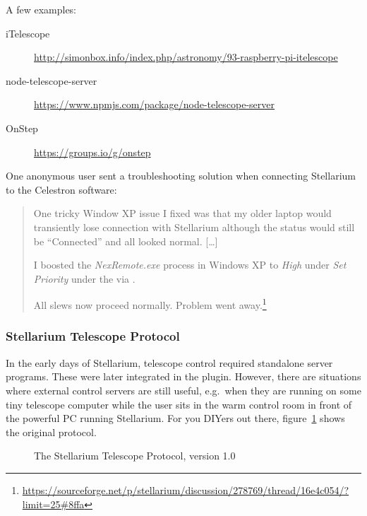 A few examples:
\begin{description}
\item[iTelescope] \url{http://simonbox.info/index.php/astronomy/93-raspberry-pi-itelescope}
\item[node-telescope-server] \url{https://www.npmjs.com/package/node-telescope-server}
\item[OnStep] \url{https://groups.io/g/onstep}
\end{description}

One anonymous user sent a troubleshooting solution when connecting Stellarium to the Celestron  software:
\begin{quote}

  One tricky Window XP issue I fixed was that my older laptop would
  transiently lose connection with Stellarium although the status
  would still be ``Connected'' and all looked normal. [\ldots]


  I boosted the \emph{NexRemote.exe} process in Windows XP to \emph{High} under
  \emph{Set Priority} under the  via
  .

  All slews now proceed normally. Problem went
  away.\footnote{\url{https://sourceforge.net/p/stellarium/discussion/278769/thread/16e4c054/?limit=25\#8ffa}}
\end{quote}



\subsubsection{Stellarium Telescope Protocol}
\label{sec:plugins:TelescopeControl:Other:Protocol}

In the early days of Stellarium, telescope control required standalone server programs. 
These were later integrated in the plugin. However, there are situations where external control servers are still useful, 
e.g.\ when they are running on some tiny telescope computer while the user sits in the warm control room in front of the powerful PC running Stellarium. 
For you DIYers out there, figure~\ref{fig:plugins:TelescopeControl:Other:Protocol} shows the original protocol.


\begin{figure}[bp]
\begin{center}
\end{center}
\caption{The Stellarium Telescope Protocol, version 1.0}
\label{fig:plugins:TelescopeControl:Other:Protocol}
\end{figure}

